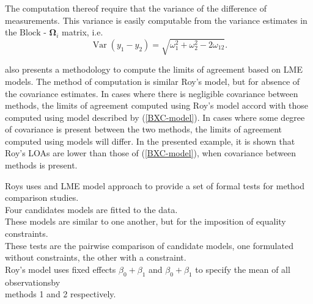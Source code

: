 \documentclass[12pt, a4paper]{report}
\theoremstyle{plain}
\theoremstyle{definition}
\theoremstyle{remark}
\begin{document}
	The computation thereof require that the variance of the difference of measurements. This variance is easily computable from the  variance estimates in the ${\mbox{Block - }\boldsymbol \Omega_{i}}$ matrix, i.e.
	\[
	\operatorname{Var}(y_1 - y_2) = \sqrt{ \omega^2_1 + \omega^2_2 - 2\omega_{12}}.
	\]
	
	\citet{BXC2008} also presents a methodology to compute the limits of agreement based on LME models. The method of computation is similar Roy's model, but for absence of the covariance estimates. In cases where there is negligible covariance between methods, the limits of agreement computed using Roy's model accord with those computed using model described by (\ref{BXC-model}). In cases where some degree of covariance is present between the two methods, the limits of agreement computed using models will differ. In the presented example, it is shown that Roy's LOAs are lower than those of (\ref{BXC-model}), when covariance between methods is present.
	
	
	
	
	
	
	
	
	
	Roys uses and LME model approach to provide a set of formal tests for method comparison studies.\\
	
	Four candidates models are fitted to the data.\\
	
	These models are similar to one another, but for the imposition of equality constraints.\\
	
	These tests are the pairwise comparison of candidate models, one formulated without constraints, the other with a constraint.\\
	
	
	Roy's model uses fixed effects $\beta_0 + \beta_1$ and $\beta_0 + \beta_1$ to specify the mean of all observationsby \\ methods 1 and 2 respectively.
	
\end{document}
